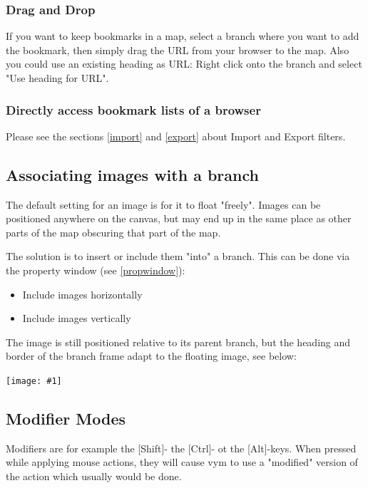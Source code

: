 \documentclass[12pt,a4paper]{article}
\newcommand{\maximage}[1]{  
    \begin{center}
        \texttt{[image: \#1]} 
    \end{center}
}
\newcommand{\vym}{{\sc vym }}
\newcommand{\key}[1]{[#1]}
\begin{document}
\subsubsection*{Drag and Drop}
If you want to keep bookmarks in a map, select a branch where you want
to add the bookmark, then simply drag the URL from your browser to the
map. Also you could use an existing heading as URL: Right click onto the
branch and select "Use heading for URL".


\subsubsection*{Directly access bookmark lists of a browser}
Please see the sections \ref{import} and \ref{export} about
Import and Export filters.

\subsection{Associating images with a branch} \label{incimg}
The default setting for an image is for it to float "freely". Images can
be positioned anywhere on the canvas, but may end up in the same place
as other parts of the map obscuring that part of the map.

The solution is to insert or include them "into" a branch. This can be
done via the property window (see \ref{propwindow}):
\begin{itemize}
    \item Include images horizontally
    \item Include images vertically
\end{itemize}
The image is still positioned relative to its parent branch, but the
heading and border of the branch frame adapt to the floating image, see
below: \maximage{images/includeImages.png}

\subsection{Modifier Modes} 
Modifiers are for example the \key{Shift}- the \key{Ctrl}- ot the
\key{Alt}-keys. When pressed while applying mouse actions, they will
cause \vym to use a "modified" version of the action which usually would
be done. 

\end{document}
